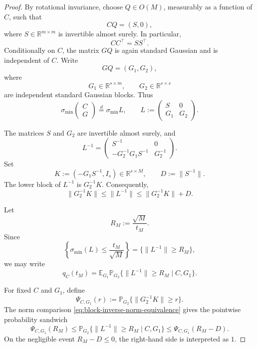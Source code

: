 \documentclass[10pt,a4paper]{amsart}
\newcommand{\Ebb}{\mathbb E}
\newcommand{\Pbb}{\mathbb P}
\newcommand{\R}{\mathbb R}
\newcommand{\smin}{\sigma_{\min}}
\theoremstyle{plain}
\begin{document}
\begin{proof}
By rotational invariance, choose \(Q\in O(M)\), measurably as a function of \(C\), such
that
\[
        CQ=(S,0),
\]
where \(S\in\R^{m\times m}\) is invertible almost surely.  In particular,
\[
        CC^\top=SS^\top.
\]
Conditionally on \(C\), the matrix \(GQ\) is again standard Gaussian and is independent of
\(C\).  Write
\[
        GQ=(G_1,G_2),
\]
where
\[
        G_1\in\R^{s\times m},
        \qquad
        G_2\in\R^{s\times s}
\]
are independent standard Gaussian blocks.  Thus
\[
        \smin\begin{pmatrix}C\\G\end{pmatrix}
        \stackrel{d}{=}
        \smin L,
        \qquad
        L:=
        \begin{pmatrix}
        S&0\\
        G_1&G_2
        \end{pmatrix}.
\]

The matrices \(S\) and \(G_2\) are invertible almost surely, and
\[
        L^{-1}
        =
        \begin{pmatrix}
        S^{-1}&0\\
        -G_2^{-1}G_1S^{-1}&G_2^{-1}
        \end{pmatrix}.
\]
Set
\[
        K:=(-G_1S^{-1},I_s)\in\R^{s\times M},
        \qquad
        D:=\|S^{-1}\|.
\]
The lower block of \(L^{-1}\) is \(G_2^{-1}K\).  Consequently,
\begin{equation}
        \|G_2^{-1}K\|
        \le
        \|L^{-1}\|
        \le
        \|G_2^{-1}K\|+D.
        \label{eq:block-inverse-norm-equivalence}
\end{equation}

Let
\[
        R_M:=\frac{\sqrt M}{t_M}.
\]
Since
\[
        \left\{\smin(L)\le\frac{t_M}{\sqrt M}\right\}
        =
        \{\|L^{-1}\|\ge R_M\},
\]
we may write
\[
        q_C(t_M)
        =
        \Ebb_{G_1}
        \Pbb_{G_2}\{\|L^{-1}\|\ge R_M\mid C,G_1\}.
\]

For fixed \(C\) and \(G_1\), define
\[
        \Psi_{C,G_1}(r)
        :=
        \Pbb_{G_2}\{\|G_2^{-1}K\|\ge r\}.
\]
The norm comparison \eqref{eq:block-inverse-norm-equivalence} gives the pointwise
probability sandwich
\begin{equation}
        \Psi_{C,G_1}(R_M)
        \le
        \Pbb_{G_2}\{\|L^{-1}\|\ge R_M\mid C,G_1\}
        \le
        \Psi_{C,G_1}(R_M-D).
        \label{eq:block-inverse-probability-sandwich}
\end{equation}
On the negligible event \(R_M-D\le0\), the right-hand side is interpreted as \(1\).


\end{proof}
\end{document}
